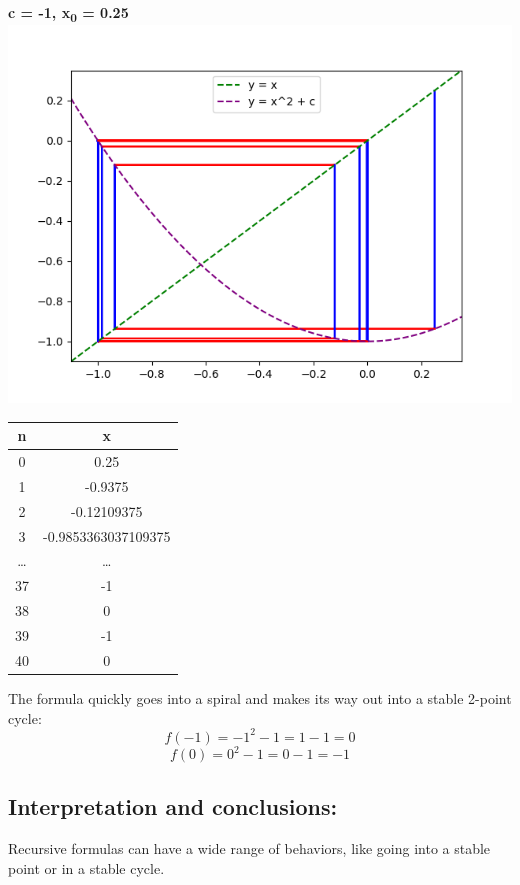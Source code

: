 \documentclass{article}
\begin{document}
\begin{center}
    \textbf{c = -1, x\textsubscript{0} = 0.25}
    \includegraphics[scale=0.8]{7}
    \begin{tabular}{| c | c |}
        \hline
        n & x\\
        \hline
        0 & 0.25\\
        1 & -0.9375\\
        2 & -0.12109375\\ 
        3 & -0.9853363037109375\\
        \dots & \dots \\ 
        37 & -1\\
        38 &  0\\
        39 & -1\\
        40 &  0\\
        \hline
    \end{tabular}
    \end{center}
    The formula quickly goes into a spiral and makes its way out into a stable 2-point cycle:
    \[
    f(-1) = -1^{2} - 1 = 1 - 1 = 0 
    \]
    \[
    f(0) = 0^{2} - 1 = 0 - 1 = -1 
    \]

 \subsection*{Interpretation and conclusions:}
Recursive formulas can have a wide range of behaviors, like going into a stable point or in a stable cycle.
\end{document}
